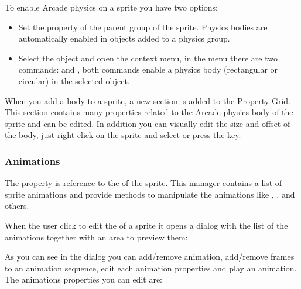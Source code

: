 \documentclass[letterpaper,10pt,english]{sphinxmanual}
\begin{document}
To enable Arcade physics on a sprite you have two options:
\begin{itemize}
\item {} 
Set  the  property of the parent group of the sprite. Physics bodies are automatically enabled in objects added to a physics group.

\item {} 
Select the object and open the context menu, in the  menu there are two commands:  and , both commands enable a physics body (rectangular or circular) in the selected object.

\end{itemize}

\noindent{}

When you add a body to a sprite, a new section  is added to the Property Grid. This section contains many properties related to the Arcade physics body of the sprite and can be edited. In addition you can visually edit the size and offset of the body, just right click on the sprite and select  or press the  key.

\noindent{}


\subsubsection{Animations}
\label{\detokenize{canvas:animations}}
The  property is reference to the  of the sprite. This manager contains a list of sprite animations and provide methods to manipulate the animations like , ,  and others.

When the user click to edit the  of a sprite it opens a dialog with the list of the animations together with an area to preview them:

\noindent{}

As you can see in the dialog you can add/remove animation, add/remove frames to an animation sequence, edit each animation properties and play an animation. The animations properties you can edit are:
\end{document}
